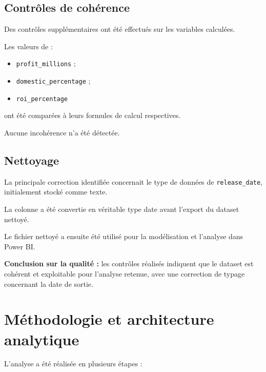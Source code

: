\documentclass[a4paper,11pt]{article}
\newcommand{\varname}[1]{\texttt{#1}}
\begin{document}
\subsection{Contrôles de cohérence}

Des contrôles supplémentaires ont été effectués sur les variables calculées.

Les valeurs de :
\begin{itemize}
  \item \varname{profit\_millions} ;
  \item \varname{domestic\_percentage} ;
  \item \varname{roi\_percentage}
\end{itemize}
ont été comparées à leurs formules de calcul respectives.

Aucune incohérence n'a été détectée.

\subsection{Nettoyage}

La principale correction identifiée concernait le type de données de
\varname{release\_date}, initialement stocké comme texte.

La colonne a été convertie en véritable type date avant l'export du dataset
nettoyé.

Le fichier nettoyé a ensuite été utilisé pour la modélisation et l'analyse
dans Power BI.

\textbf{Conclusion sur la qualité :} les contrôles réalisés indiquent que le
dataset est cohérent et exploitable pour l'analyse retenue, avec une
correction de typage concernant la date de sortie.

\section{Méthodologie et architecture analytique}

L'analyse a été réalisée en plusieurs étapes :
\end{document}
